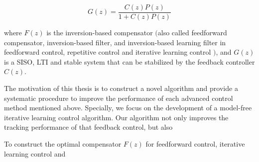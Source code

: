 \documentclass[a4paper, 12pt, twoside, openright]{mythesis}
\begin{document}
\begin{equation}
 G(z) =\frac{C(z)P(z)}{1+C(z)P(z)}
\label{eq:Closed_loop_G(z)}
\end{equation}
 
where $F(z)$ is the inversion-based compensator $($also called feedforward compensator, inversion-based filter, and inversion-based learning filter in feedforward control, repetitive control and iterative learning control $)$, and $G(z)$ is a SISO, LTI and stable system that can be stabilized by the feedback controller $C(z)$.



The motivation of this thesis is to construct a novel algorithm and provide a systematic procedure to improve the performance of each advanced control method mentioned above. Specially, we focus on the development of a model-free iterative learning control algorithm. Our algorithm not only improves the tracking performance of that feedback control, but also 




To construct the optimal compensator $F(z)$ for feedforward control, iterative learning control and 


%
\end{document}
